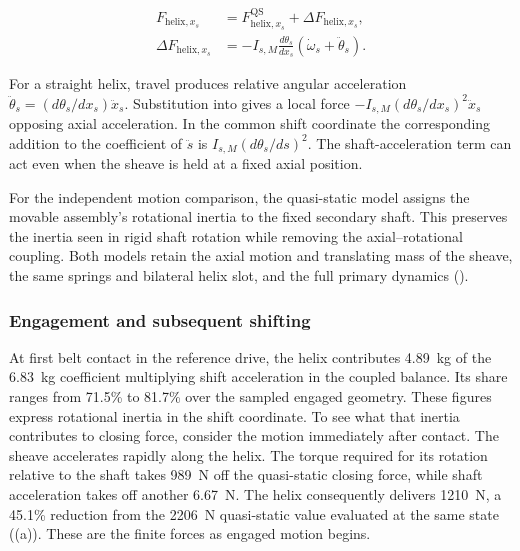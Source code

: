 \documentclass[11pt]{report}
\numberwithin{equation}{section}
\begin{document}
\begin{equation}
\begin{aligned}
 F_{\mathrm{helix},x_s}
 &=F_{\mathrm{helix},x_s}^{\mathrm{QS}}
   +\Delta F_{\mathrm{helix},x_s},\\
 \Delta F_{\mathrm{helix},x_s}
 &=-I_{s,M}\frac{d\theta_s}{dx_s}
       (\dot\omega_s+\ddot\theta_s).
\end{aligned}
 \label{eq:results_secondary_dynamic_decomposition}
\end{equation}

For a straight helix, travel produces relative angular acceleration
\(\ddot\theta_s=(d\theta_s/dx_s)\ddot x_s\). Substitution into
 gives a local force
\(-I_{s,M}(d\theta_s/dx_s)^2\ddot x_s\) opposing axial acceleration.
In the common shift coordinate the corresponding addition to the
coefficient of \(\ddot s\) is \(I_{s,M}(d\theta_s/ds)^2\).
The shaft-acceleration term can act even when the sheave is held at a
fixed axial position.

For the independent motion comparison, the quasi-static model assigns
the movable assembly's rotational inertia to the fixed secondary shaft.
This preserves the inertia seen in rigid shaft rotation while removing
the axial--rotational coupling. Both models retain the axial motion and
translating mass of the sheave, the same springs and bilateral helix slot,
and the full primary dynamics
().

\subsubsection{Engagement and subsequent shifting}
\label{sec:results_secondary_hybrid_response}

At first belt contact in the reference drive, the helix contributes
\SI{4.89}{kg} of the \SI{6.83}{kg} coefficient multiplying shift
acceleration in the coupled balance. Its share ranges from
\num{71.5}\% to \num{81.7}\% over the sampled engaged geometry.
These figures express rotational inertia in the shift coordinate.
To see what that inertia contributes to closing force, consider the
motion immediately after contact. The sheave accelerates rapidly along
the helix. The torque required for its rotation relative to the shaft
takes \SI{989}{N} off the quasi-static closing force, while shaft
acceleration takes off another \SI{6.67}{N}. The helix consequently
delivers \SI{1210}{N}, a \num{45.1}\% reduction from the
\SI{2206}{N} quasi-static value evaluated at the same state
((a)). These are the finite forces as
engaged motion begins.
\end{document}
